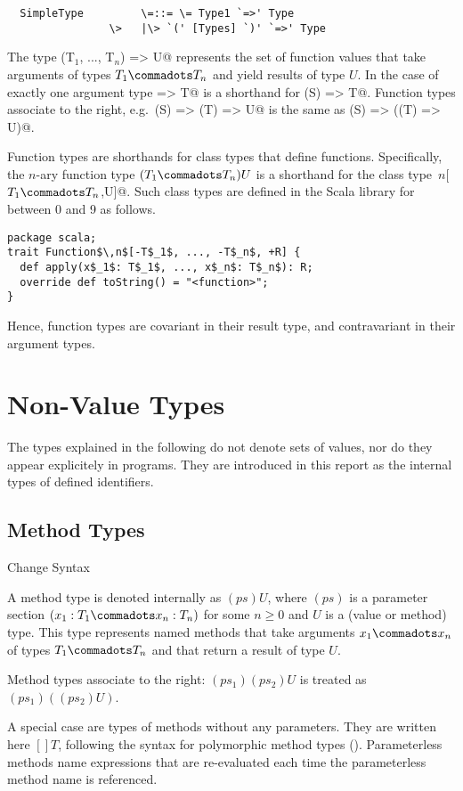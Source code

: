 \documentclass[11pt]{report}
\renewcommand{\todo}[1]{#1}
\begin{document}
\syntax\begin{verbatim}
  SimpleType         \=::= \= Type1 `=>' Type
                \>   |\> `(' [Types] `)' `=>' Type
\end{verbatim}
The type \verb@(T$_1$, ..., T$_n$) => U@ represents the set of function
values that take arguments of types $T_1 \commadots T_n$ and yield
results of type $U$.  In the case of exactly one argument type
\verb@S => T@ is a shorthand for \verb@(S) => T@.  Function types
associate to the right, e.g.\ \verb@(S) => (T) => U@ is the same as
\verb@(S) => ((T) => U)@.

Function types are shorthands for class types that define \verb@apply@
functions.  Specifically, the $n$-ary function type $(T_1 \commadots
T_n)U$ is a shorthand for the class type
\verb@Function$\,n$[$T_1 \commadots T_n$,U]@. Such class
types are defined in the Scala library for \verb@n@ between 0 and 9 as follows.
\begin{verbatim}
package scala;
trait Function$\,n$[-T$_1$, ..., -T$_n$, +R] {
  def apply(x$_1$: T$_1$, ..., x$_n$: T$_n$): R;
  override def toString() = "<function>";
}
\end{verbatim}
Hence, function types are covariant in their result type, and
contravariant in their argument types.

\section{Non-Value Types}
\label{sec:synthetic-types}

The types explained in the following do not denote sets of values, nor
do they appear explicitely in programs. They are introduced in this
report as the internal types of defined identifiers.

\subsection{Method Types}
\label{sec:method-types}\todo{Change Syntax}

A method type is denoted internally as $(ps)U$, where $(ps)$ is a
parameter section $(x_1: T_1 \commadots x_n: T_n)$ for some $n \geq 0$
and $U$ is a (value or method) type.  This type represents named
methods that take arguments $x_1 \commadots x_n$ of types $T_1
\commadots T_n$ and that return a result of type $U$.

Method types associate to the right: $(ps_1)(ps_2)U$ is treated as
$(ps_1)((ps_2)U)$.

A special case are types of methods without any parameters. They are
written here $[]T$, following the syntax for polymorphic method types
(). Parameterless methods name expressions that
are re-evaluated each time the parameterless method name is
referenced.
\end{document}
